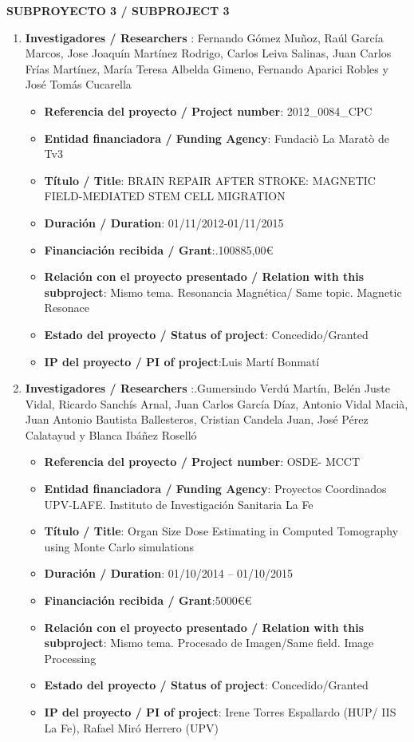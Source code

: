 \noindent\textbf{SUBPROYECTO 3 / SUBPROJECT 3}
 \begin{enumerate}
 \item {\bf Investigadores / Researchers }: Fernando Gómez Muñoz, Raúl García Marcos, Jose Joaquín Martínez Rodrigo, Carlos Leiva Salinas, Juan Carlos Frías Martínez, María Teresa Albelda Gimeno, Fernando Aparici Robles y José Tomás Cucarella
 \begin{itemize}
 \item {\bf Referencia del proyecto / Project number}: 2012\_0084\_CPC
 \item {\bf Entidad financiadora / Funding Agency}: Fundaciò La Maratò de Tv3
 \item {\bf Título / Title}:  BRAIN REPAIR AFTER STROKE: MAGNETIC FIELD-MEDIATED STEM CELL MIGRATION
 \item {\bf Duración / Duration}: 01/11/2012-01/11/2015 
 \item {\bf Financiación recibida / Grant}:.100885,00\euro  
 \item {\bf Relación con el proyecto presentado / Relation with this subproject}: Mismo tema. Resonancia Magnética/ Same topic. Magnetic Resonace
 \item {\bf Estado del proyecto / Status of project}: Concedido/Granted
 \item {\bf IP del proyecto / PI of project}:Luis Martí Bonmatí 
 \end{itemize}

 \item {\bf Investigadores / Researchers }:.Gumersindo Verdú Martín, Belén Juste Vidal, Ricardo Sanchís Arnal, Juan Carlos García Díaz, Antonio Vidal Macià, Juan Antonio Bautista Ballesteros, Cristian Candela Juan, José Pérez Calatayud y Blanca Ibáñez Roselló
 \begin{itemize}
 \item {\bf Referencia del proyecto / Project number}: OSDE- MCCT
 \item {\bf Entidad financiadora / Funding Agency}: Proyectos Coordinados UPV-LAFE. Instituto de Investigación Sanitaria La Fe
 \item {\bf Título / Title}: Organ Size Dose Estimating in Computed Tomography using Monte Carlo simulations 
 \item {\bf Duración / Duration}: 01/10/2014 – 01/10/2015
 \item {\bf Financiación recibida / Grant}:5000\euro€
 \item {\bf Relación con el proyecto presentado / Relation with this subproject}: Mismo tema. Procesado de Imagen/Same field. Image Processing
 \item {\bf Estado del proyecto / Status of project}: Concedido/Granted
 \item {\bf IP del proyecto / PI of project}: Irene Torres Espallardo (HUP/ IIS La Fe), Rafael Miró Herrero (UPV)
 \end{itemize}


\end{enumerate}
